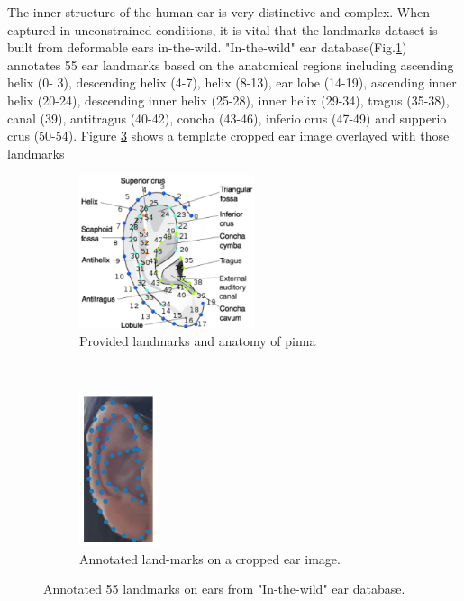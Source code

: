 The inner structure of the human ear is very distinctive and complex. When captured in unconstrained conditions, it is vital that the landmarks dataset is built from deformable ears in-the-wild. "In-the-wild" ear database(Fig.\ref{fig:ear-in-the-wild-landmarks}) annotates 55 ear landmarks based on the anatomical regions including ascending helix (0- 3), descending helix (4-7), helix (8-13), ear lobe (14-19), ascending inner helix (20-24), descending inner helix (25-28), inner helix (29-34), tragus (35-38), canal (39), antitragus (40-42), concha (43-46), inferio crus (47-49) and supperio crus (50-54). Figure \ref{fig:ear-landmarks} shows a template cropped ear image overlayed with those landmarks 
\begin{figure}
  \centering
  \begin{subfigure}[t]{0.64\columnwidth}
      \centering
      \includegraphics[height=4.5cm]{figures/ear-in-the-wild.png}
      \caption{Provided landmarks and anatomy of pinna\cite{zhou2017deformable}}
      \label{fig:ear-in-the-wild-landmarks}
  \end{subfigure}%
  ~ 
  \begin{subfigure}[t]{0.34\columnwidth}
      \centering
      \includegraphics[height=4.5cm]{figures/template-landmarks.png}
      \caption{Annotated land-marks on a cropped ear image.}
      \label{fig:template-landmarks}
  \end{subfigure}
  \caption{Annotated 55 landmarks on ears from "In-the-wild" ear database\cite{zhou2017deformable}.}
  \label{fig:ear-landmarks}
\end{figure}

